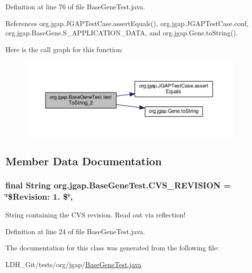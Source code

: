 Definition at line 76 of file Base\-Gene\-Test.\-java.



References org.\-jgap.\-J\-G\-A\-P\-Test\-Case.\-assert\-Equals(), org.\-jgap.\-J\-G\-A\-P\-Test\-Case.\-conf, org.\-jgap.\-Base\-Gene.\-S\-\_\-\-A\-P\-P\-L\-I\-C\-A\-T\-I\-O\-N\-\_\-\-D\-A\-T\-A, and org.\-jgap.\-Gene.\-to\-String().



Here is the call graph for this function\-:
\nopagebreak
\begin{figure}[H]
\begin{center}
\leavevmode
\includegraphics[width=350pt]{classorg_1_1jgap_1_1_base_gene_test_adc93f7f406a22a00b578002e99a22fcb_cgraph}
\end{center}
\end{figure}




\subsection{Member Data Documentation}
\hypertarget{classorg_1_1jgap_1_1_base_gene_test_aa6ac0a1de88c8143bfd3fb4174a09427}{
\subsubsection[{C\-V\-S\-\_\-\-R\-E\-V\-I\-S\-I\-O\-N}]{\setlength{\rightskip}{0pt plus 5cm}final String org.\-jgap.\-Base\-Gene\-Test.\-C\-V\-S\-\_\-\-R\-E\-V\-I\-S\-I\-O\-N = \char`\"{}\$Revision\-: 1. \$\char`\"{}\hspace{0.3cm}{\ttfamily [static]}, {\ttfamily [private]}}}\label{classorg_1_1jgap_1_1_base_gene_test_aa6ac0a1de88c8143bfd3fb4174a09427}
String containing the C\-V\-S revision. Read out via reflection! 

Definition at line 24 of file Base\-Gene\-Test.\-java.



The documentation for this class was generated from the following file\-:\begin{DoxyCompactItemize}
\item 
L\-D\-H\-\_\-\-Git/tests/org/jgap/\hyperlink{_base_gene_test_8java}{Base\-Gene\-Test.\-java}\end{DoxyCompactItemize}
